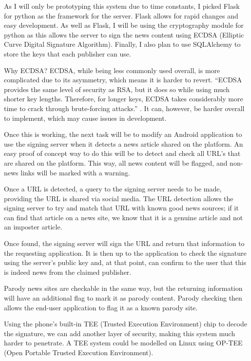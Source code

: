 \documentclass[11pt,a4paper]{report}
\begin{document}
As I will only be prototyping this system due to time constants, I picked Flask for python as the framework for the server. Flask allows for rapid changes and easy development. As well as Flask, I will be using the cryptography module for python as this allows the server to sign the news content using ECDSA (Elliptic Curve Digital Signature Algorithm). Finally, I also plan to use SQLAlchemy to store the keys that each publisher can use.

Why ECDSA? ECDSA, while being less commonly used overall, is more complicated due to its asymmetry, which means it is harder to revert. “ECDSA provides the same level of security as RSA, but it does so while using much shorter key lengths. Therefore, for longer keys, ECDSA takes considerably more time to crack through brute-forcing attacks.” \citep{RSA}. It can, however, be harder overall to implement, which may cause issues in development.

Once this is working, the next task will be to modify an Android application to use the signing server when it detects a news article shared on the platform. An easy proof of concept way to do this will be to detect and check all URL’s that are shared on the platform. This way, all news content will be flagged, and non-news links will be marked with a warning.

Once a URL is detected, a query to the signing server needs to be made, providing the URL is shared via social media. The URL detection allows the signing server to try and match that URL with known good news sources; if it can find that article on a news site, we know that it is a genuine article and not an imposter article. 

Once found, the signing server will sign the URL and return that information to the requesting application. It is then up to the application to check the signature using the server’s public key and, at that point, can confirm to the user that this is indeed news from the claimed publisher.

Parody news sites are checkable in the same way, but the returning information will have an additional flag to mark it as parody content. Parody checking then allows the end-user application to flag it as a known parody site.

Using the phone’s built-in TEE (Trusted Execution Environment) chip to decode the signature, we can add another layer of security, making this system much harder to penetrate. A TEE system could be modelled on Linux using OP-TEE (Open Portable Trusted Execution Environment).
\end{document}
